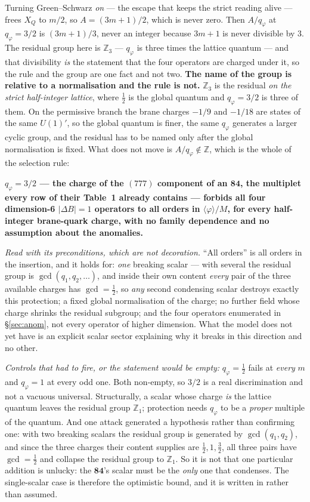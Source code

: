 \documentclass[11pt,a4paper]{article}
\newcommand{\ZZ}{\mathbb{Z}}
\newcommand{\rep}[1]{\mathbf{#1}}
\newenvironment{keyeq}
  {\begin{center}\setlength{\fboxsep}{9pt}\setlength{\fboxrule}{0.8pt}%
   \begin{lrbox}{\keyeqbox}\begin{minipage}{0.88\textwidth}}
  {\end{minipage}\end{lrbox}%
   \fcolorbox{hdrblue!55}{hdrblue!6}{\usebox{\keyeqbox}}\end{center}}
\begin{document}
Turning Green--Schwarz \emph{on} --- the escape that keeps the strict reading alive --- frees $X_Q$
to $m/2$, so $A=(3m+1)/2$, which is never zero. Then $A/q_\varphi$ at $q_\varphi=3/2$ is
$(3m+1)/3$, never an integer because $3m+1$ is never divisible by $3$. The residual group here is
$\ZZ_3$ --- $q_\varphi$ is three times the lattice quantum --- and that divisibility \emph{is} the
statement that the four operators are charged under it, so the rule and the group are one fact and
not two. \textbf{The name of the group is relative to a normalisation and the rule is not.} $\ZZ_3$
is the residual \emph{on the strict half-integer lattice}, where $\tfrac12$ is the global quantum
and $q_\varphi=3/2$ is three of them. On the permissive branch the brane charges $-1/9$ and $-1/18$
are states of the same $U(1)'$, so the global quantum is finer, the same $q_\varphi$ generates a
larger cyclic group, and the residual has to be named only after the global normalisation is fixed.
What does not move is $A/q_\varphi\notin\ZZ$, which is the whole of the selection rule:

\begin{keyeq}
\textbf{$q_\varphi=3/2$ --- the charge of the $(777)$ component of an $\rep{84}$, the multiplet
every row of their Table~1 already contains --- forbids all four dimension-6 $|\Delta B|=1$
operators to all orders in $\langle\varphi\rangle/M$, for every half-integer brane-quark charge, with
no family dependence and no assumption about the anomalies.}

\smallskip
\noindent\emph{Read with its preconditions, which are not decoration.} ``All orders'' is all orders in
the insertion, and it holds for: \emph{one} breaking scalar --- with several the residual group is
$\gcd(q_1,q_2,\dots)$, and inside their own content \emph{every} pair of the three available charges
has $\gcd=\tfrac12$, so \emph{any} second condensing scalar destroys exactly this protection; a fixed
global normalisation of the charge; no further field whose charge shrinks the residual subgroup; and
the four operators enumerated in \S\ref{sec:anom}, not every operator of higher dimension. What the
model does not yet have is an explicit scalar sector explaining why it breaks in this direction and
no other.
\end{keyeq}

\emph{Controls that had to fire, or the statement would be empty:} $q_\varphi=\tfrac12$ fails at
\emph{every} $m$ and $q_\varphi=1$ at every odd one. Both non-empty, so $3/2$ is a real
discrimination and not a vacuous universal. Structurally, a scalar whose charge \emph{is} the
lattice quantum leaves the residual group $\ZZ_1$; protection needs $q_\varphi$ to be a
\emph{proper} multiple of the quantum. And one attack generated a hypothesis rather than confirming
one: with two breaking scalars the residual group is generated by $\gcd(q_1,q_2)$, and since the three
charges their content supplies are $\tfrac12,1,\tfrac32$, all three pairs have $\gcd=\tfrac12$ and
collapse the residual group to $\ZZ_1$. So it is not that one particular addition is unlucky: the
$\rep{84}$'s scalar must be the \emph{only} one that condenses. The single-scalar case is therefore
the optimistic bound, and it is written in rather than assumed.
\end{document}
